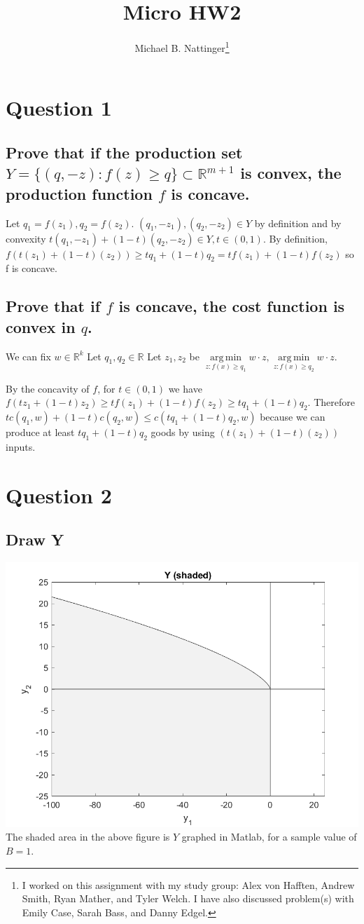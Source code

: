 \documentclass[11pt]{article} %
\title{Micro HW2}
\author{Michael B. Nattinger\footnote{I worked on this assignment with my study group: Alex von Hafften, Andrew Smith, Ryan Mather, and Tyler Welch. I have also discussed problem(s) with Emily Case, Sarah Bass, and Danny Edgel.}}
\DeclareMathOperator*{\argmin}{arg\,min}
\begin{document}
\maketitle

\section{Question 1}

\subsection{Prove that if the production set $Y = \{ (q,-z):f(z) \geq q \} \subset \mathbb{R}^{m+1}$ is convex, the production function $f$ is concave.}
Let $q_1 = f(z_1), q_2 = f(z_2)$. $(q_1,-z_1),(q_2,-z_2) \in Y$ by definition and by convexity $t(q_1,-z_1)+(1-t)(q_2,-z_2)\in Y,t\in(0,1)$. By definition, $f(t(z_1)+(1-t)(z_2)) \geq tq_1 + (1-t) q_2 = tf(z_1) + (1-t)f(z_2)$ so f is concave.

\subsection{Prove that if $f$ is concave, the cost function is convex in $q$.}
We can fix $w \in \mathbb{R}^k$ Let $q_1,q_2 \in \mathbb{R}$ Let $z_1,z_2$ be $\argmin\limits_{z:f(x)\geq q_1} w \cdot z, \argmin\limits_{z:f(x)\geq q_2} w \cdot z.$

By the concavity of $f$, for $t \in (0,1)$ we have $f(tz_1 + (1-t)z_2) \geq tf(z_1) + (1-t)f(z_2) \geq tq_1 + (1-t)q_2.$  Therefore $ t c(q_1,w) + (1-t)c(q_2,w) \leq c(tq_1+ (1-t) q_2,w)$ because we can produce at least $tq_1 + (1-t)q_2$ goods by using $(t(z_1) + (1-t)(z_2))$ inputs.

\section{Question 2}
\subsection{Draw Y}
\includegraphics{Y}
The shaded area in the above figure is $Y$ graphed in Matlab, for a sample value of $B=1$.
\end{document}
